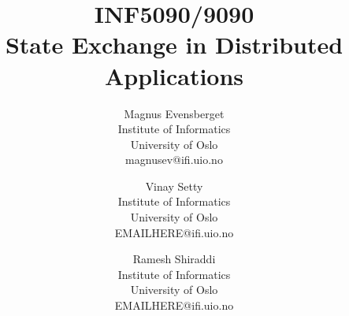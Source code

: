 \documentclass[12pt, conference, compsocconf, letterpaper]{IEEEtran}
\begin{document}
\title{INF5090/9090\\State Exchange in Distributed Applications}

%
%
%
%
%

%
\author{
	Magnus Evensberget\\
	Institute of Informatics\\
	University of Oslo\\
	magnusev@ifi.uio.no
\and
	Vinay Setty\\
	Institute of Informatics\\
	University of Oslo\\
	EMAILHERE@ifi.uio.no
\and
	Ramesh Shiraddi\\
	Institute of Informatics\\
	University of Oslo\\
	EMAILHERE@ifi.uio.no
}


\end{document}
